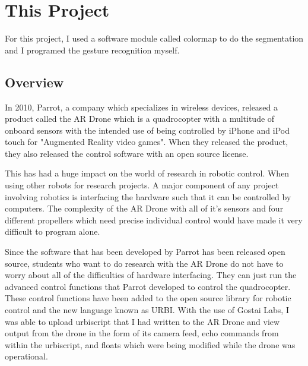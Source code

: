 \documentclass[a4paper,12pt]{report}
\begin{document}
\section{This Project}
For this project, I used a software module called colormap to do the segmentation and I programed the gesture recognition myself. 
\subsection{Overview}
In 2010, Parrot, a company which specializes in wireless devices, released a product called the AR Drone which is a quadrocopter with a multitude of onboard sensors with the intended use of being controlled by iPhone and iPod touch for "Augmented Reality video games". When they released the product, they also released the control software with an open source license. 

This has had a huge impact on the world of research in robotic control. When using other robots for research projects. A major component of any project involving robotics is interfacing the hardware such that it can be controlled by computers. The complexity of the AR Drone with all of it's sensors and four different propellers which need precise individual control would have made it very difficult to program alone.  

Since the software that has been developed by Parrot has been released open source, students who want to do research with the AR Drone do not have to worry about all of the difficulties of hardware interfacing. They can just run the advanced control functions that Parrot developed to control the quadrocopter. These control functions have been added to the open source library for robotic control and the new language known as URBI. With the use of Gostai Labs, I was able to upload urbiscript that I had written to the AR Drone and view output from the drone in the form of its camera feed, echo commands from within the urbiscript, and floats which were being modified while the drone was operational.
\end{document}
